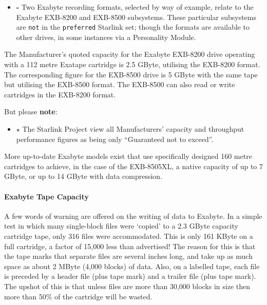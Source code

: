 \documentclass[11pt]{article}
\begin{document}
\begin {itemize}

\item[{\huge\bf -}] Two Exabyte recording formats, selected by way of example,
relate to the Exabyte EXB-8200 and EXB-8500 subsystems. These particular
subsystems are {\tt not} in the {\tt preferred} Starlink set; though the
formats are available to other drives, in some instances via a Personality
Module.

\end {itemize}

The Manufacturer's quoted capacity for the Exabyte EXB-8200 drive operating
with a 112 metre Exatape cartridge is 2.5 GByte, utilising the EXB-8200
format. The corresponding figure  for the EXB-8500 drive is 5 GByte with the
same tape but utilising the EXB-8500 format. The EXB-8500 can also read or
write cartridges in the EXB-8200 format.

But please {\bf note}:
\begin {itemize}

\item[{\LARGE\bf $\star$}] The Starlink Project view all Manufacturers' capacity
and throughput performance figures as being only ``Guaranteed not to exceed''.

\end {itemize}
More up-to-date Exabyte models exist that use specifically designed 160 metre
cartridges to achieve, in the case of the EXB-8505XL, a native capacity of
up to 7 GByte, or up to 14 GByte with data compression.

\paragraph {Exabyte Tape Capacity}

A few words of warning are offered on the writing of data to Exabyte. In a
simple test in which many single-block files were `copied' to a 2.3 GByte
capacity cartridge tape, only 316 files were accommodated. This is only 161
KByte on a full cartridge, a factor of 15,000 less than advertised! The
reason for this is that the tape marks that separate files are several
inches long, and take up as much space as about 2 MByte (4,000 blocks) of
data. Also, on a labelled tape, each file is preceded by a header file (plus
tape mark) and a trailer file (plus tape mark). The upshot of this is that
unless files are more than 30,000 blocks in size then more than 50\% of the
cartridge will be wasted.
\end{document}
